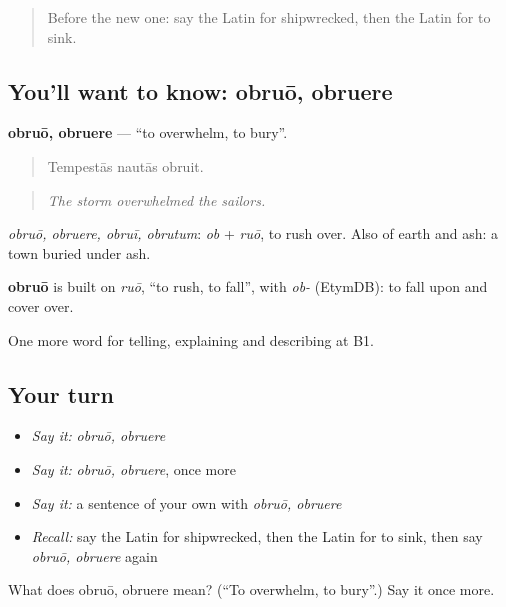 \begin{quote}
Before the new one: say the Latin for shipwrecked, then the Latin for to sink.
\end{quote}

\subsection*{You'll want to know: obruō, obruere}
\textbf{obruō, obruere} — \textquotedblleft{}to overwhelm, to bury\textquotedblright{}.

\begin{quote}
Tempestās nautās obruit.
\end{quote}

\begin{quote}
\emph{The storm overwhelmed the sailors.}
\end{quote}

\emph{obruō, obruere, obruī, obrutum}: \emph{ob} + \emph{ruō}, to rush over. Also of earth and ash: a town buried under ash.

\begin{cousinweb}
\textbf{obruō} is built on \emph{ruō}, \textquotedblleft{}to rush, to fall\textquotedblright{}, with \emph{ob-} (EtymDB): to fall upon and cover over.
\end{cousinweb}

\begin{grammarlens}[title={What you've built}]
One more word for telling, explaining and describing at B1.
\end{grammarlens}

\subsection*{Your turn}
\begin{itemize}
\raggedright
  \item \emph{Say it:} \emph{obruō, obruere}
  \item \emph{Say it:} \emph{obruō, obruere}, once more
  \item \emph{Say it:} a sentence of your own with \emph{obruō, obruere}
  \item \emph{Recall:} say the Latin for shipwrecked, then the Latin for to sink, then say \emph{obruō, obruere} again
\end{itemize}

\begin{tcolorbox}[breakable,colback=teal!4,colframe=teal!35!black,title={Before you move on}]
What does obruō, obruere mean? (\textquotedblleft{}To overwhelm, to bury\textquotedblright{}.) Say it once more.
\end{tcolorbox}
